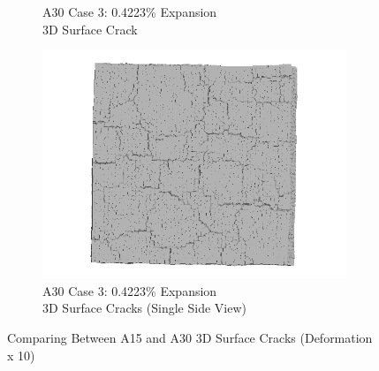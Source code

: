 \begin{figure}[ht!]
\begin{subfigure}{.5\textwidth}
    \caption{A30 Case 3: 0.4223\% Expansion\\ 3D Surface Crack}
    \end{subfigure}%
    \begin{subfigure}{.5\textwidth}
      \centering
      \includegraphics[width=.8\linewidth]{Files/exp_3D/ASR/A30P75_3_3ds.png}
    \caption{A30 Case 3: 0.4223\% Expansion\\ 3D Surface Cracks (Single Side View)}
    \end{subfigure}

  \caption{Comparing Between A15 and A30 3D Surface Cracks (Deformation x 10)}
  \label{fig:ASR_A15vsA30P75_3D}
\end{figure}

